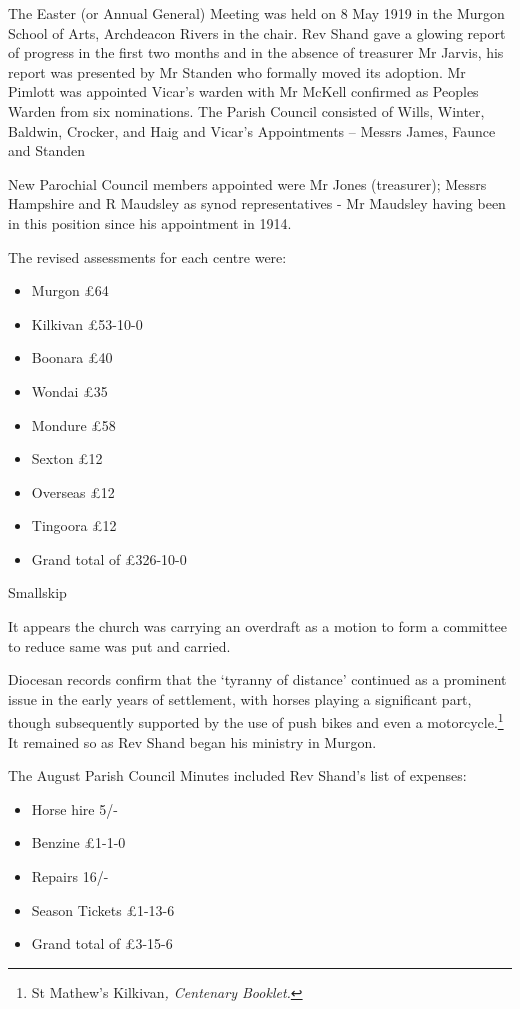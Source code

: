 The Easter (or Annual General) Meeting was held on 8 May 1919 in the Murgon School of Arts, Archdeacon Rivers in the chair. Rev Shand gave a glowing report of progress in the first two months and in the absence of treasurer Mr Jarvis, his report was presented by Mr Standen who formally moved its adoption. Mr Pimlott was appointed Vicar's warden with Mr McKell confirmed as Peoples Warden from six nominations. The Parish Council consisted of Wills, Winter, Baldwin, Crocker, and Haig and Vicar's Appointments -- Messrs James, Faunce and Standen

New Parochial Council members appointed were Mr Jones (treasurer); Messrs Hampshire and R Maudsley as synod representatives - Mr Maudsley having been in this position since his appointment in 1914.

The revised assessments for each centre were:

\begin{itemize}
\item
  Murgon £64
\item
  Kilkivan £53-10-0
\item
  Boonara £40
\item
  Wondai £35
\item
  Mondure £58
\item
  Sexton £12
\item
  Overseas £12
\item
  Tingoora £12
\item
  Grand total of £326-10-0
\end{itemize}

Smallskip

It appears the church was carrying an overdraft as a motion to form a committee to reduce same was put and carried.

Diocesan records confirm that the `tyranny of distance' continued as a prominent issue in the early years of settlement, with horses playing a significant part, though subsequently supported by the use of push bikes and even a motorcycle.\footnote{St Mathew's Kilkivan\emph{, Centenary Booklet.}} It remained so as Rev Shand began his ministry in Murgon.

The August Parish Council Minutes included Rev Shand's list of expenses:

\begin{itemize}
\item
  Horse hire 5/-
\item
  Benzine £1-1-0
\item
  Repairs 16/-
\item
  Season Tickets £1-13-6
\item
  Grand total of £3-15-6
\end{itemize}


